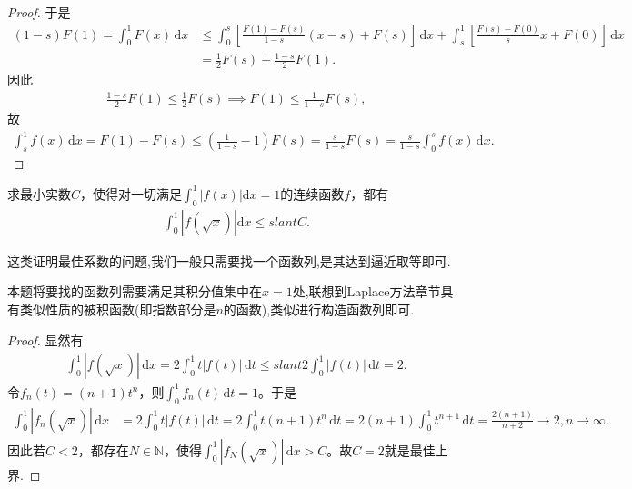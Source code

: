 \documentclass[../../main.tex]{subfiles}
\begin{document}
\begin{proof}
于是
\begin{align*}
(1 - s) F(1) = \int_0^1 F(x) \, \mathrm{d}x &\leqslant  \int_0^s \left[ \frac{F(1) - F(s)}{1 - s}(x - s) + F(s) \right] \, \mathrm{d}x + \int_s^1 \left[ \frac{F(s) - F(0)}{s}x + F(0) \right] \, \mathrm{d}x \\
&= \frac{1}{2} F(s) + \frac{1 - s}{2} F(1).
\end{align*}
因此
\begin{align*}
\frac{1 - s}{2} F(1) \leqslant  \frac{1}{2} F(s) \implies F(1) \leqslant  \frac{1}{1 - s} F(s),
\end{align*}
故
\begin{align*}
\int_s^1 f(x) \, \mathrm{d}x = F(1) - F(s) \leqslant  \left( \frac{1}{1 - s} - 1 \right) F(s) = \frac{s}{1 - s} F(s) = \frac{s}{1 - s} \int_0^s f(x) \, \mathrm{d}x.
\end{align*}
\end{proof}

\begin{example}
求最小实数$C$，使得对一切满足$\int_{0}^{1}|f(x)|\mathrm{d}x = 1$的连续函数$f$，都有
\begin{align*}
\int_{0}^{1}|f(\sqrt{x})|\mathrm{d}x \leqslant slant C.
\end{align*}
\end{example}
\begin{remark}
这类证明最佳系数的问题,我们一般只需要找一个函数列,是其达到逼近取等即可.

本题将要找的函数列需要满足其积分值集中在$x=1$处,联想到Laplace方法章节具有类似性质的被积函数(即指数部分是$n$的函数),类似进行构造函数列即可.
\end{remark}
\begin{proof}
显然有
\begin{align*}
\int_0^1 |f(\sqrt{x})| \, \mathrm{d}x = 2 \int_0^1 t |f(t)| \, \mathrm{d}t \leqslant slant 2 \int_0^1 |f(t)| \, \mathrm{d}t = 2.
\end{align*}
令$f_n(t) = (n+1) t^n$，则$\int_0^1 f_n(t) \, \mathrm{d}t = 1$。于是
\begin{align*}
\int_0^1 |f_n(\sqrt{x})| \, \mathrm{d}x &= 2 \int_0^1 t |f(t)| \, \mathrm{d}t = 2 \int_0^1 t (n+1) t^n \, \mathrm{d}t 
= 2 (n+1) \int_0^1 t^{n+1} \, \mathrm{d}t = \frac{2(n+1)}{n+2} \to 2, n \to \infty.
\end{align*}
因此若$C < 2$，都存在$N \in \mathbb{N}$，使得$\int_0^1 |f_N(\sqrt{x})| \, \mathrm{d}x > C$。故$C = 2$就是最佳上界.
\end{proof}
\end{document}
